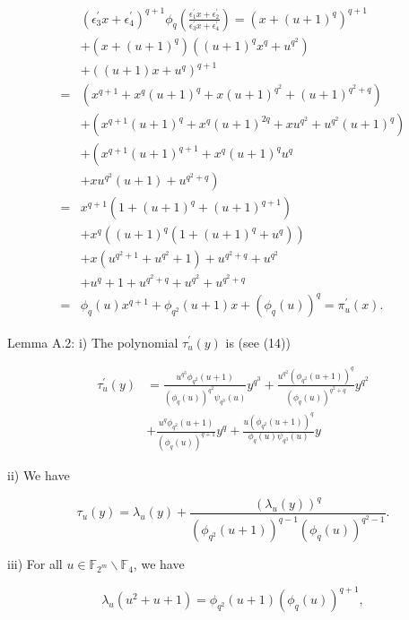 \documentclass[10pt]{article}
\begin{document}
$$
\begin{aligned}
& \left(\epsilon_{3}^{\prime} x+\epsilon_{4}^{\prime}\right)^{q+1} \phi_{q}\left(\frac{\epsilon_{1}^{\prime} x+\epsilon_{2}^{\prime}}{\epsilon_{3}^{\prime} x+\epsilon_{4}^{\prime}}\right)=\left(x+(u+1)^{q}\right)^{q+1} \\
& +\left(x+(u+1)^{q}\right)\left((u+1)^{q} x^{q}+u^{q^{2}}\right) \\
& +\left((u+1) x+u^{q}\right)^{q+1} \\
= & \left(x^{q+1}+x^{q}(u+1)^{q}+x(u+1)^{q^{2}}+(u+1)^{q^{2}+q}\right) \\
& +\left(x^{q+1}(u+1)^{q}+x^{q}(u+1)^{2 q}+x u^{q^{2}}+u^{q^{2}}(u+1)^{q}\right) \\
& +\left(x^{q+1}(u+1)^{q+1}+x^{q}(u+1)^{q} u^{q}\right. \\
& \left.+x u^{q^{2}}(u+1)+u^{q^{2}+q}\right) \\
= & x^{q+1}\left(1+(u+1)^{q}+(u+1)^{q+1}\right) \\
& +x^{q}\left((u+1)^{q}\left(1+(u+1)^{q}+u^{q}\right)\right) \\
& +x\left(u^{q^{2}+1}+u^{q^{2}}+1\right)+u^{q^{2}+q}+u^{q^{2}} \\
& +u^{q}+1+u^{q^{2}+q}+u^{q^{2}}+u^{q^{2}+q} \\
= & \phi_{q}(u) x^{q+1}+\phi_{q^{2}}(u+1) x+\left(\phi_{q}(u)\right)^{q}=\pi_{u}^{\prime}(x) .
\end{aligned}
$$

Lemma A.2: i) The polynomial $\tau_{u}^{\prime}(y)$ is (see (14))

$$
\begin{aligned}
\tau_{u}^{\prime}(y) & =\frac{u^{q^{3}} \phi_{q^{2}}(u+1)}{\left(\phi_{q}(u)\right)^{q^{2}} \psi_{q^{3}}(u)} y^{q^{3}}+\frac{u^{q^{2}}\left(\phi_{q^{2}}(u+1)\right)^{q}}{\left(\phi_{q}(u)\right)^{q^{2}+q}} y^{q^{2}} \\
& +\frac{u^{q} \phi_{q^{2}}(u+1)}{\left(\phi_{q}(u)\right)^{q+1}} y^{q}+\frac{u\left(\phi_{q^{2}}(u+1)\right)^{q}}{\phi_{q}(u) \psi_{q^{3}}(u)} y
\end{aligned}
$$

ii) We have

$$
\tau_{u}(y)=\lambda_{u}(y)+\frac{\left(\lambda_{u}(y)\right)^{q}}{\left(\phi_{q^{2}}(u+1)\right)^{q-1}\left(\phi_{q}(u)\right)^{q^{2}-1}} .
$$

iii) For all $u \in \mathbb{F}_{2^{m}} \backslash \mathbb{F}_{4}$, we have

$$
\lambda_{u}\left(u^{2}+u+1\right)=\phi_{q^{2}}(u+1)\left(\phi_{q}(u)\right)^{q+1},
$$
\end{document}
